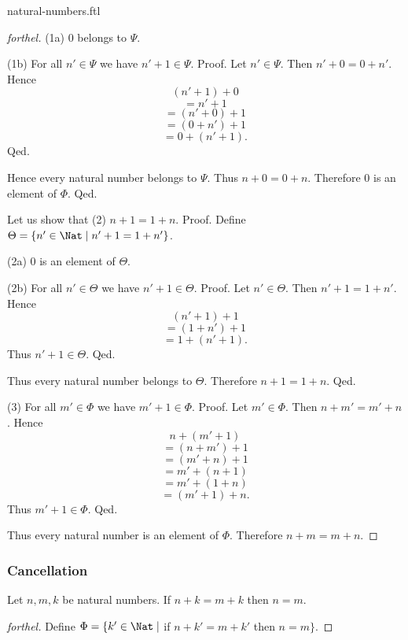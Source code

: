 \documentclass{naproche-library}
\begin{document}
\begin{smodule}{natural-numbers.ftl}
\begin{proof}[forthel]
      (1a) $0$ belongs to $\Psi$.

      (1b) For all $n' \in \Psi$ we have $n' + 1 \in \Psi$. \newline
      Proof.
        Let $n' \in \Psi$.
        Then $n' + 0 = 0 + n'$.
        Hence
        \[  (n' + 1) + 0        \]
        \[    = n' + 1          \]
        \[    = (n' + 0) + 1    \]
        \[    = (0 + n') + 1    \]
        \[    = 0 + (n' + 1).   \]
      Qed.

      Hence every natural number belongs to $\Psi$.
      Thus $n + 0 = 0 + n$.
      Therefore $0$ is an element of $\Phi$.
    Qed.

    Let us show that (2) $n + 1 = 1 + n$. \newline
    Proof.
      Define $\Theta = \{ n' \in \Nat \mid n' + 1 = 1 + n' \}$.

      (2a) $0$ is an element of $\Theta$.

      (2b) For all $n' \in \Theta$ we have $n' + 1 \in \Theta$. \newline
      Proof.
        Let $n' \in \Theta$.
        Then $n' + 1 = 1 + n'$.
        Hence
        \[  (n' + 1) + 1        \]
        \[    = (1 + n') + 1    \]
        \[    = 1 + (n' + 1).   \]
        Thus $n' + 1 \in \Theta$.
      Qed.

      Thus every natural number belongs to $\Theta$.
      Therefore $n + 1 = 1 + n$.
    Qed.

    (3) For all $m' \in \Phi$ we have $m' + 1 \in \Phi$. \newline
    Proof.
      Let $m' \in \Phi$.
      Then $n + m' = m' + n$.
      Hence
      \[  n + (m'  + 1)       \]
      \[    = (n + m') + 1    \]
      \[    = (m' + n) + 1    \]
      \[    = m' + (n + 1)    \]
      \[    = m' + (1 + n)    \]
      \[    = (m' + 1) + n.   \]
      Thus $m' + 1 \in \Phi$.
    Qed.

    Thus every natural number is an element of $\Phi$.
    Therefore $n + m = m + n$.
  \end{proof}


  \subsubsection*{Cancellation}

  \begin{proposition}[forthel,id=ARITHMETIC_03_3137702874578944]
    Let $n, m, k$ be natural numbers.
    If $n + k = m + k$ then $n = m$.
  \end{proposition}
  \begin{proof}[forthel]
    Define $\Phi = \{ k' \in \Nat \mid$ if $n + k' = m + k'$ then $n = m \}$.


\end{proof}
\end{smodule}
\end{document}
